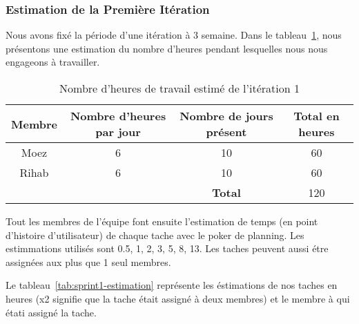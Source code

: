 \subsubsection{Estimation de la Première Itération}

Nous avons fixé la période d'une itération à 3 semaine. Dans le
tableau~\ref{tab:sprint1-capacity}, nous présentons une estimation du nombre
d'heures pendant lesquelles nous nous engageons à travailler.

\begin{table}[htbp]
    \centering
    \begin{tabular}{| c | c | c | c |}
        \hline
        \textbf{Membre} & \textbf{Nombre d'heures par jour} & \textbf{Nombre de jours présent} & \textbf{Total en heures} \\ \hline
        \hline

Moez & 6 & 10 & 60\\ \hline
Rihab & 6 & 10 & 60 \\ \hline
\multicolumn{2}{c|}{} & \textbf{Total} & 120 \\ \cline{3-4}
    \end{tabular}
    \caption{Nombre d'heures de travail estimé de l'itération 1}
    \label{tab:sprint1-capacity}
\end{table}

Tout les membres de l'équipe font ensuite l'estimation de temps (en point
d'histoire d'utilisateur) de chaque tache avec le poker de planning. Les
estimmations utilisés sont 0.5, 1, 2, 3, 5, 8, 13. Les taches peuvent aussi
étre assignées aux plus que 1 seul membres.

Le tableau~\ref{tab:sprint1-estimation} représente les éstimations de nos
taches en heures (x2 signifie que la tache était assigné à deux membres) et
le membre à qui étati assigné la tache.

